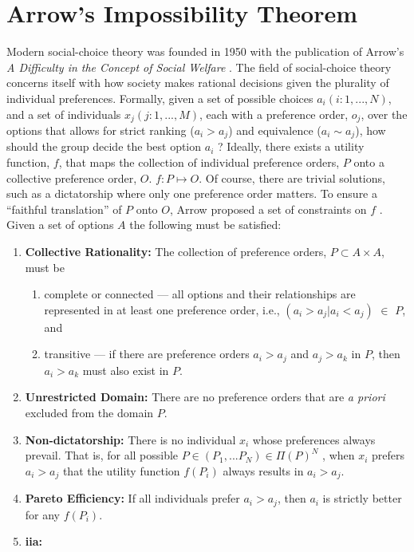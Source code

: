 \section{Arrow's Impossibility Theorem}
\label{section:arrows-thm}

Modern social-choice theory was founded in 1950 with the publication of Arrow's
\textit{A Difficulty in the Concept of Social Welfare}
\cite{arrow_difficulty_1950}. The field of social-choice theory concerns itself
with how society makes rational decisions given the plurality of individual
preferences. Formally, given a set of possible choices $a_i (i: 1,..., N)$, and
a set of individuals $x_j (j:1, ...,M)$, each with a preference order, $o_j$, over the
options that allows for strict ranking ($a_i > a_j$) and equivalence ($a_i \sim
a_j$), how should the group decide the best option $a_i$
\cite{franssen_arrows_2005}? Ideally, there exists a utility function, $f$, that maps
the collection of individual preference orders, $P$ onto a collective preference order, $O$.
$f: P \mapsto O$. Of course, there are trivial solutions, such as a dictatorship where
only one preference order matters. To ensure a ``faithful translation'' of $P$ onto $O$, 
Arrow proposed a set of constraints on $f$ \cite{arrow_difficulty_1950,franssen_arrows_2005}.
Given a set of options $A$ the following must be satisfied:
\begin{enumerate}
    \item \textbf{Collective Rationality:} The collection of preference orders, $P \subset A\times A$,
    must be
    \begin{enumerate}
        \item complete or connected --- all options and their relationships are represented in at
        least one preference order, i.e., $(a_i > a_j | a_i < a_j)$ $\in$ $P$, and
        \item transitive --- if there are preference orders $a_i > a_j$ and $a_j > a_k$ in $P$, then
        $a_i > a_k$ must also exist in $P$.
    \end{enumerate}
    \item \textbf{Unrestricted Domain:}
    There are no preference orders that are \textit{a priori} excluded from the domain $P$.
    \item \textbf{Non-dictatorship:} There is no individual $x_i$ whose preferences always prevail. That is,
    for all possible $P \in (P_1, ... P_N) \in \Pi(P)^N$ , when $x_i$ prefers $a_i > a_j$ that the utility function $f(P_i)$ always
    results in $a_i > a_j$.
    \item \textbf{Pareto Efficiency:} If all individuals prefer $a_i > a_j$, then $a_i$ is strictly better
    for any $f(P_i)$.
    \item \textbf{\ac{iia}:}
\end{enumerate}


